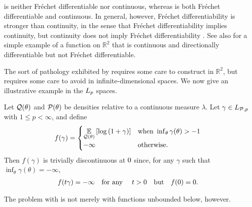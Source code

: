  is neither Fr{\'e}chet differentiable nor continuous,
whereas  is both Fr{\'e}chet differentiable and
continuous.  In general, however, Fr{\'e}chet differentiability is stronger than
continuity, in the sense that Fr{\'e}chet differentiability implies continuity,
but continuity does not imply Fr{\'e}chet differentiability \citep[Proposition
4.8 (d)]{zeidler:2013:functional}.  See also \citet[Example
1.9]{averbukh:1967:theory} for a simple example of a function on $\mathbb{R}^2$
that is continuous and directionally differentiable but not Fr{\'e}chet
differentiable.

The sort of pathology exhibited by 
requires some care to construct in $\mathbb{R}^2$, but requires some care to
avoid in infinite-dimensional spaces.  We now give an illustrative example in
the ${L_{p}}$ spaces.


\begin{ex}
%
Let $\mathcal{Q}(\theta)$ and $\mathcal{P}(\theta)$ be densities relative to a continuous measure
$\lambda$.  Let $\gamma \in {L_{\mathcal{P},p}}$ with $1 \le p < \infty$, and define
%
\begin{align*}
%
f(\gamma) = \begin{cases}
\expect{\q(\theta)}{\log\left(1 + \gamma\right)}
    & \textrm{when }\inf_\theta \gamma(\theta) > -1 \\
-\infty & \textrm{otherwise}.
\end{cases}
%
\end{align*}
%
Then $f(\gamma)$ is trivially discontinuous at $0$ since, for any $\gamma$
such that $\inf_\theta \gamma(\theta) = -\infty$,
%
\begin{align*}
%
f(\t \gamma) = -\infty \mathtxt{for any }\t > 0 \mathtxt{but} f(\phiz) = 0.
%
\end{align*}
%
\end{ex}

The problem with  is not merely with
functions unbounded below, however.

